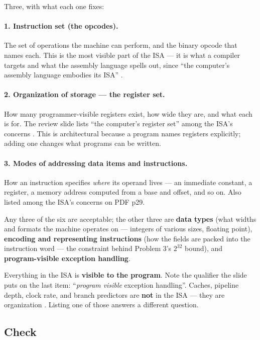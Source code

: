 Three, with what each one fixes:

\paragraph{1. Instruction set (the opcodes).}
The set of operations the machine can perform, and the binary opcode that names
each. This is the most visible part of the ISA — it is what a compiler targets
and what the assembly language spells out, since ``the computer's assembly
language embodies its ISA'' .

\paragraph{2. Organization of storage — the register set.}
How many programmer-visible registers exist, how wide they are, and what each is
for. The review slide lists ``the computer's register set'' among the ISA's
concerns . This is architectural because a program names
registers explicitly; adding one changes what programs can be written.

\paragraph{3. Modes of addressing data items and instructions.}
How an instruction specifies \emph{where} its operand lives — an immediate
constant, a register, a memory address computed from a base and offset, and so
on. Also listed among the ISA's concerns on PDF p29.

Any three of the six are acceptable; the other three are \textbf{data types}
(what widths and formats the machine operates on — integers of various sizes,
floating point), \textbf{encoding and representing instructions} (how the fields
are packed into the instruction word — the constraint behind Problem 3's
$2^{32}$ bound), and \textbf{program-visible exception handling}.

\begin{trap}
Everything in the ISA is \textbf{visible to the program}. Note the qualifier the
slide puts on the last item: ``\emph{program visible} exception handling''.
Caches, pipeline depth, clock rate, and branch predictors are \textbf{not} in
the ISA — they are organization . Listing one of
those answers a different question.
\end{trap}

\subsection*{Check}

